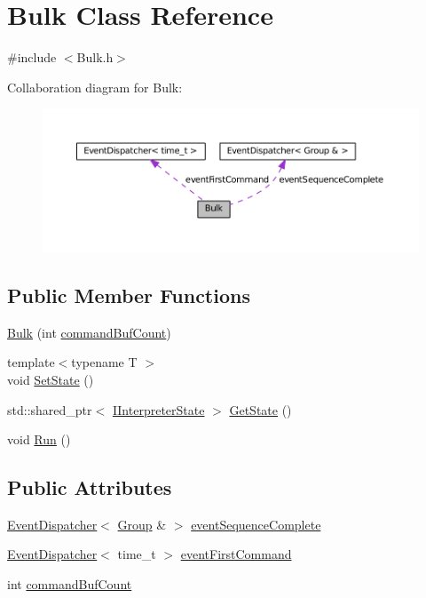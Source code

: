 \hypertarget{class_bulk}{}\section{Bulk Class Reference}
\label{class_bulk}


{\ttfamily \#include $<$Bulk.\+h$>$}



Collaboration diagram for Bulk\+:
\nopagebreak
\begin{figure}[H]
\begin{center}
\leavevmode
\includegraphics[width=350pt]{class_bulk__coll__graph}
\end{center}
\end{figure}
\subsection*{Public Member Functions}
\begin{DoxyCompactItemize}
\item 
\hyperlink{class_bulk_a3cb233a46de98d8111b7ae7606ba1460}{Bulk} (int \hyperlink{class_bulk_ac4c14e391ab0654fc1a2b6aea0b77410}{command\+Buf\+Count})
\item 
{\footnotesize template$<$typename T $>$ }\\void \hyperlink{class_bulk_ab420aeb70efbd54b1a7975c18da12c8f}{Set\+State} ()
\item 
std\+::shared\+\_\+ptr$<$ \hyperlink{class_i_interpreter_state}{I\+Interpreter\+State} $>$ \hyperlink{class_bulk_aa210e457c6f020835bde3bb67e0cfce3}{Get\+State} ()
\item 
void \hyperlink{class_bulk_a1be5c7493701769d6f95f1b37d94b752}{Run} ()
\end{DoxyCompactItemize}
\subsection*{Public Attributes}
\begin{DoxyCompactItemize}
\item 
\hyperlink{class_event_dispatcher}{Event\+Dispatcher}$<$ \hyperlink{struct_group}{Group} \& $>$ \hyperlink{class_bulk_ad4947c6f7732da98f7c62095f5c1d009}{event\+Sequence\+Complete}
\item 
\hyperlink{class_event_dispatcher}{Event\+Dispatcher}$<$ time\+\_\+t $>$ \hyperlink{class_bulk_a91a718a401201286c8f50d2488abc661}{event\+First\+Command}
\item 
int \hyperlink{class_bulk_ac4c14e391ab0654fc1a2b6aea0b77410}{command\+Buf\+Count}
\end{DoxyCompactItemize}


